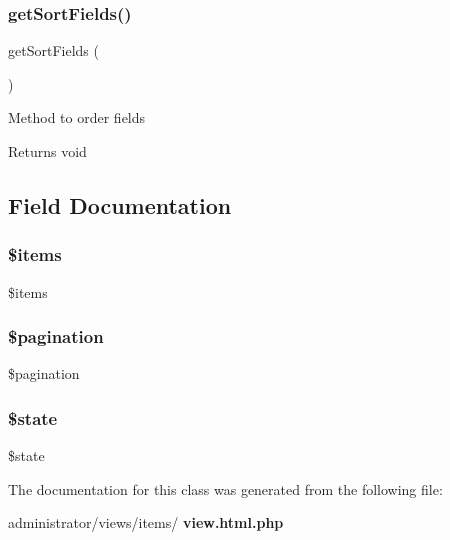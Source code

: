 \subsubsection{get\+Sort\+Fields()}
{\footnotesize\ttfamily get\+Sort\+Fields (\begin{DoxyParamCaption}{ }\end{DoxyParamCaption})\hspace{0.3cm}{\ttfamily [protected]}}

Method to order fields

\begin{DoxyReturn}{Returns}
void 
\end{DoxyReturn}


\subsection{Field Documentation}
\mbox{\label{classtks__agenda_view_items_a737abdef83dabb219182c1e88887c6c3}} 
\subsubsection{\$items}
{\footnotesize\ttfamily \$items\hspace{0.3cm}{\ttfamily [protected]}}

\mbox{\label{classtks__agenda_view_items_a388a4a950e936f746d3b9c1b56450ce7}} 
\subsubsection{\$pagination}
{\footnotesize\ttfamily \$pagination\hspace{0.3cm}{\ttfamily [protected]}}

\mbox{\label{classtks__agenda_view_items_ae82306c4f2d17d8dd5c7d8d916b33bed}} 
\subsubsection{\$state}
{\footnotesize\ttfamily \$state\hspace{0.3cm}{\ttfamily [protected]}}



The documentation for this class was generated from the following file\+:\begin{DoxyCompactItemize}
\item 
administrator/views/items/\textbf{ view.\+html.\+php}\end{DoxyCompactItemize}
